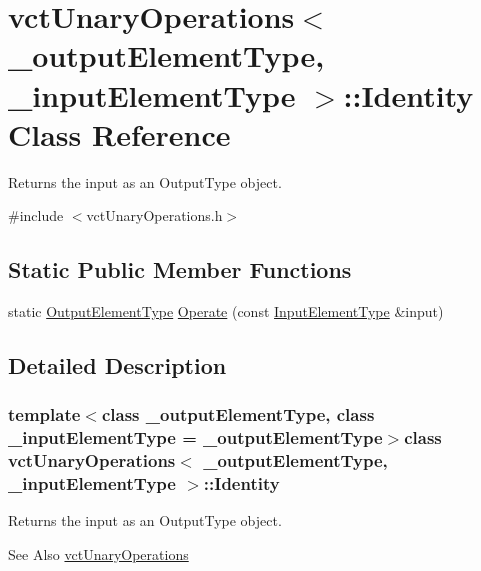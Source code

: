 \hypertarget{classvct_unary_operations_1_1_identity}{\section{vct\-Unary\-Operations$<$ \-\_\-output\-Element\-Type, \-\_\-input\-Element\-Type $>$\-:\-:Identity Class Reference}
\label{classvct_unary_operations_1_1_identity}
}


Returns the input as an Output\-Type object.  




{\ttfamily \#include $<$vct\-Unary\-Operations.\-h$>$}

\subsection*{Static Public Member Functions}
\begin{DoxyCompactItemize}
\item 
static \hyperlink{classvct_unary_operations_a42306ac3dd20d32c6d6c66ac3fa2e7b9}{Output\-Element\-Type} \hyperlink{classvct_unary_operations_1_1_identity_ac4ee894a3313fdc802c84c95f454bcdc}{Operate} (const \hyperlink{classvct_unary_operations_abf3b77bb7b8abd7ba72a6a45a65696a7}{Input\-Element\-Type} \&input)
\end{DoxyCompactItemize}


\subsection{Detailed Description}
\subsubsection*{template$<$class \-\_\-output\-Element\-Type, class \-\_\-input\-Element\-Type = \-\_\-output\-Element\-Type$>$class vct\-Unary\-Operations$<$ \-\_\-output\-Element\-Type, \-\_\-input\-Element\-Type $>$\-::\-Identity}

Returns the input as an Output\-Type object. 

\begin{DoxySeeAlso}{See Also}
\hyperlink{classvct_unary_operations}{vct\-Unary\-Operations} 
\end{DoxySeeAlso}


